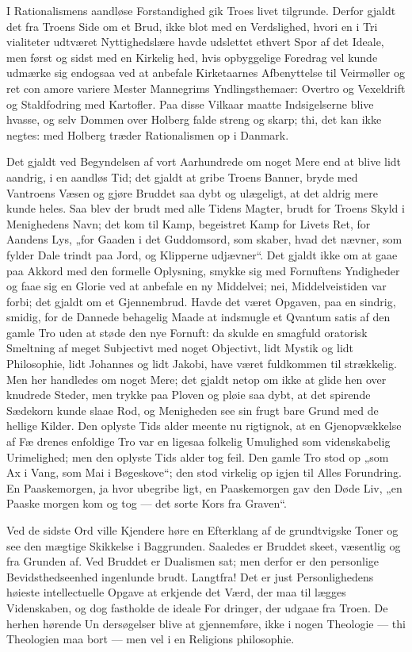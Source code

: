 \documentclass[12pt]{book}
\newcommand{\opage}[1]{\marginnote{\footnotesize\textit{[#1]}}}
\begin{document}
I Rationalismens aandløse Forstandighed gik Troes\-%
livet tilgrunde. Derfor gjaldt det fra Troens Side om
et Brud, ikke blot med en Verdslighed, hvori en i Tri\-%
vialiteter udtværet Nyttighedslære havde udslettet ethvert
Spor af det Ideale, men først og sidst med en Kirkelig\-%
hed, hvis opbyggelige Foredrag vel kunde udmærke sig
endogsaa ved at anbefale Kirketaarnes Afbenyttelse til
Veirmøller og ret con amore variere Mester Mannegrims
Yndlingsthemaer: Overtro og Vexeldrift og Staldfodring
med Kartofler. Paa disse Vilkaar maatte Indsigelserne
blive hvasse, og selv Dommen over Holberg falde streng
og skarp; thi, det kan ikke negtes: med Holberg træder
Rationalismen op i Danmark.

Det gjaldt ved Begyndelsen af vort Aarhundrede om
noget Mere end at blive lidt aandrig, i en aandløs Tid;
det gjaldt at gribe Troens Banner, bryde med Vantroens
Væsen og gjøre Bruddet saa dybt og ulægeligt, at det
aldrig mere kunde heles. Saa blev der brudt med alle
Tidens Magter, brudt for Troens Skyld i Menighedens
Navn; det kom til Kamp, begeistret Kamp for Livets
Ret, for Aandens Lys, „for Gaaden i det Guddomsord,
som skaber, hvad det nævner, som fylder Dale trindt paa
Jord, og Klipperne udjævner“. Det gjaldt ikke om at
gaae paa Akkord med den formelle Oplysning, smykke
sig med Fornuftens Yndigheder og faae sig en Glorie
ved at anbefale en ny Middelvei; nei, Middelveistiden
var forbi; det gjaldt om et Gjennembrud. Havde det
været Opgaven, paa en sindrig, smidig, for de Dannede
behagelig Maade at indsmugle et Qvantum satis af den
\opage{253}\setcounter{footnote}{0}%
gamle Tro uden at støde den nye Fornuft: da skulde en
smagfuld oratorisk Smeltning af meget Subjectivt med
noget Objectivt, lidt Mystik og lidt Philosophie, lidt
Johannes og lidt Jakobi, have været fuldkommen til\-%
strækkelig. Men her handledes om noget Mere; det gjaldt
netop om ikke at glide hen over knudrede Steder, men
trykke paa Ploven og pløie saa dybt, at det spirende
Sædekorn kunde slaae Rod, og Menigheden see sin frugt\-%
bare Grund med de hellige Kilder. Den oplyste Tids\-%
alder meente nu rigtignok, at en Gjenopvækkelse af Fæ\-%
drenes enfoldige Tro var en ligesaa folkelig Umulighed
som videnskabelig Urimelighed; men den oplyste Tids\-%
alder tog feil. Den gamle Tro stod op „som Ax i Vang,
som Mai i Bøgeskove“; den stod virkelig op igjen til
Alles Forundring. En Paaskemorgen, ja hvor ubegribe\-%
ligt, en Paaskemorgen gav den Døde Liv, „en Paaske\-%
morgen kom og tog --- det sorte Kors fra Graven“.

Ved de sidste Ord ville Kjendere høre en Efterklang
af de grundtvigske Toner og see den mægtige Skikkelse
i Baggrunden. Saaledes er Bruddet skeet, væsentlig og
fra Grunden af. Ved Bruddet er Dualismen sat; men
derfor er den personlige Bevidsthedseenhed ingenlunde
brudt. Langtfra! Det er just Personlighedens høieste
intellectuelle Opgave at erkjende det Værd, der maa til\-%
lægges Videnskaben, og dog fastholde de ideale For\-%
dringer, der udgaae fra Troen. De herhen hørende Un\-%
dersøgelser blive at gjennemføre, ikke i nogen Theologie
--- thi Theologien maa bort --- men vel i en Religions\-%
philosophie.
\end{document}
